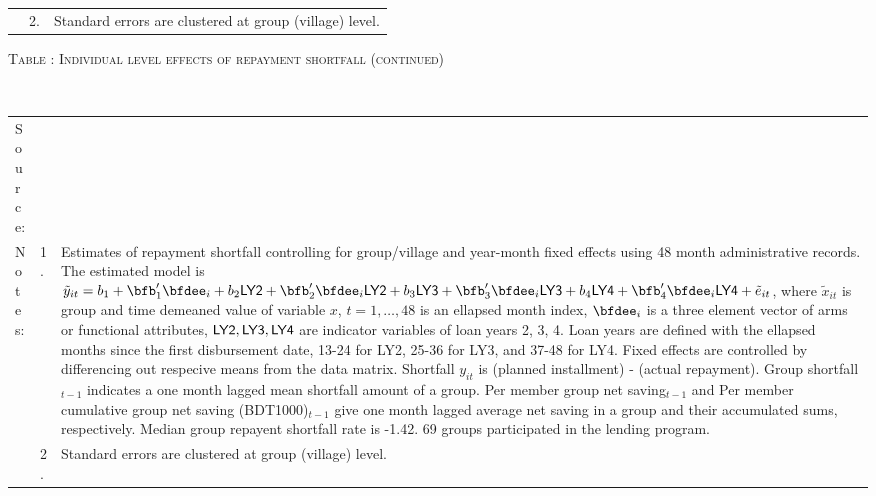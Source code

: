 \begin{minipage}[t]{14cm}
\begin{tabular}{>{\hfill\scriptsize}p{1cm}<{}>{\hfill\scriptsize}p{.25cm}<{}>{\scriptsize}p{12cm}<{\hfill}}
& 2. & Standard errors are clustered at group (village) level.
\end{tabular}
\end{minipage}

\addtocounter{table}{-1}
\hspace{-1cm}\begin{minipage}[t]{14cm}
\hfil\textsc{\normalsize Table \thetable: Individual level effects of repayment shortfall (continued)\label{tab shortfall indiv o800 3}}\\
\setlength{\tabcolsep}{1pt}
\setlength{\baselineskip}{8pt}
\renewcommand{\arraystretch}{.6}
\hfil{}\\
\renewcommand{\arraystretch}{.8}
\setlength{\tabcolsep}{1pt}
\begin{tabular}{>{\hfill\scriptsize}p{1cm}<{}>{\hfill\scriptsize}p{.25cm}<{}>{\scriptsize}p{12cm}<{\hfill}}
Source:& \multicolumn{2}{l}{\scriptsize Estimated with GUK administrative data.}\\
Notes: & 1. & Estimates of repayment shortfall controlling for group/village and year-month fixed effects using 48 month administrative records. The estimated model is $\tilde{y}_{it}=b_{1}+\bfb'_{1}\bfdee_{i}+b_{2}\mbox{\textsf{LY2}}+\bfb'_{2}\bfdee_{i}\mbox{\textsf{LY2}}+b_{3}\mbox{\textsf{LY3}}+\bfb'_{3}\bfdee_{i}\mbox{\textsf{LY3}}+b_{4}\mbox{\textsf{LY4}}+\bfb'_{4}\bfdee_{i}\mbox{\textsf{LY4}}+\tilde{e}_{it}$, where $\tilde{x}_{it}$ is group and time demeaned value of variable $x$, $t=1,\dots, 48$ is an ellapsed month index, $\bfdee_{i}$ is a three element vector of arms or functional attributes, $\mbox{\textsf{LY2}}, \mbox{\textsf{LY3}}, \mbox{\textsf{LY4}}$ are indicator variables of loan years 2, 3, 4. Loan years are defined with the ellapsed months since the first disbursement date, 13-24 for \textsf{LY2}, 25-36 for \textsf{LY3}, and 37-48 for \textsf{LY4}. Fixed effects are controlled by differencing out respecive means from the data matrix. Shortfall $y_{it}$ is (planned installment) - (actual repayment). \textsf{Group shortfall}$_{t-1}$ indicates a one month lagged mean shortfall amount of a group. \textsf{Per member group net saving}$_{t-1}$ and \textsf{Per member cumulative group net saving (BDT1000)}$_{t-1}$ give one month lagged average net saving in a group and their accumulated sums, respectively. Median group repayent shortfall rate is -1.42. 69 groups participated in the lending program. \\
& 2. & Standard errors are clustered at group (village) level.
\end{tabular}
\end{minipage}

